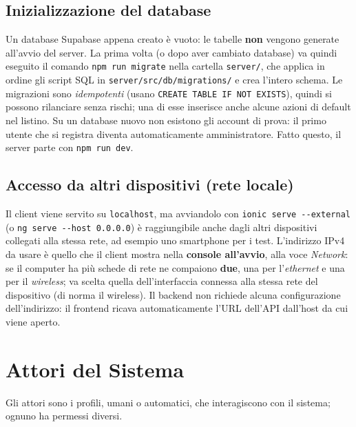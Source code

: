 \subsection{Inizializzazione del database}
Un database Supabase appena creato è vuoto: le tabelle \textbf{non} vengono generate all'avvio del server. La prima volta (o dopo aver cambiato database) va quindi eseguito il comando \texttt{npm run migrate} nella cartella \texttt{server/}, che applica in ordine gli script SQL in \texttt{server/src/db/migrations/} e crea l'intero schema. Le migrazioni sono \textit{idempotenti} (usano \texttt{CREATE TABLE IF NOT EXISTS}), quindi si possono rilanciare senza rischi; una di esse inserisce anche alcune azioni di default nel listino. Su un database nuovo non esistono gli account di prova: il primo utente che si registra diventa automaticamente amministratore. Fatto questo, il server parte con \texttt{npm run dev}.

\subsection{Accesso da altri dispositivi (rete locale)}
Il client viene servito su \texttt{localhost}, ma avviandolo con \texttt{ionic serve -\/-external} (o \texttt{ng serve -\/-host 0.0.0.0}) è raggiungibile anche dagli altri dispositivi collegati alla stessa rete, ad esempio uno smartphone per i test. L'indirizzo IPv4 da usare è quello che il client mostra nella \textbf{console all'avvio}, alla voce \textit{Network}: se il computer ha più schede di rete ne compaiono \textbf{due}, una per l'\textit{ethernet} e una per il \textit{wireless}; va scelta quella dell'interfaccia connessa alla stessa rete del dispositivo (di norma il wireless). Il backend non richiede alcuna configurazione dell'indirizzo: il frontend ricava automaticamente l'URL dell'API dall'host da cui viene aperto.

\section{Attori del Sistema}
Gli attori sono i profili, umani o automatici, che interagiscono con il sistema; ognuno ha permessi diversi.

